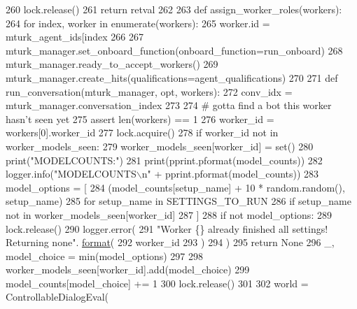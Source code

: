 \begin{DoxyCode}
{{{{260             lock.release()
261             \textcolor{keywordflow}{return} retval
262 
263         \textcolor{keyword}{def }assign\_worker\_roles(workers):
264             \textcolor{keywordflow}{for} index, worker \textcolor{keywordflow}{in} enumerate(workers):
265                 worker.id = mturk\_agent\_ids[index %
266 
267         mturk\_manager.set\_onboard\_function(onboard\_function=run\_onboard)
268         mturk\_manager.ready\_to\_accept\_workers()
269         mturk\_manager.create\_hits(qualifications=agent\_qualifications)
270 
271         \textcolor{keyword}{def }run\_conversation(mturk\_manager, opt, workers):
272             conv\_idx = mturk\_manager.conversation\_index
273 
274             \textcolor{comment}{# gotta find a bot this worker hasn't seen yet}
275             \textcolor{keyword}{assert} len(workers) == 1
276             worker\_id = workers[0].worker\_id
277             lock.acquire()
278             \textcolor{keywordflow}{if} worker\_id \textcolor{keywordflow}{not} \textcolor{keywordflow}{in} worker\_models\_seen:
279                 worker\_models\_seen[worker\_id] = set()
280             print(\textcolor{stringliteral}{"MODELCOUNTS:"})
281             print(pprint.pformat(model\_counts))
282             logger.info(\textcolor{stringliteral}{"MODELCOUNTS\(\backslash\)n"} + pprint.pformat(model\_counts))
283             model\_options = [
284                 (model\_counts[setup\_name] + 10 * random.random(), setup\_name)
285                 \textcolor{keywordflow}{for} setup\_name \textcolor{keywordflow}{in} SETTINGS\_TO\_RUN
286                 \textcolor{keywordflow}{if} setup\_name \textcolor{keywordflow}{not} \textcolor{keywordflow}{in} worker\_models\_seen[worker\_id]
287             ]
288             \textcolor{keywordflow}{if} \textcolor{keywordflow}{not} model\_options:
289                 lock.release()
290                 logger.error(
291                     \textcolor{stringliteral}{"Worker \{\} already finished all settings! Returning none"}.
      \hyperlink{namespaceparlai_1_1chat__service_1_1services_1_1messenger_1_1shared__utils_a32e2e2022b824fbaf80c747160b52a76}{format}(
292                         worker\_id
293                     )
294                 )
295                 \textcolor{keywordflow}{return} \textcolor{keywordtype}{None}
296             \_, model\_choice = min(model\_options)
297 
298             worker\_models\_seen[worker\_id].add(model\_choice)
299             model\_counts[model\_choice] += 1
300             lock.release()
301 
302             world = ControllableDialogEval(
}}}}
\end{DoxyCode}
